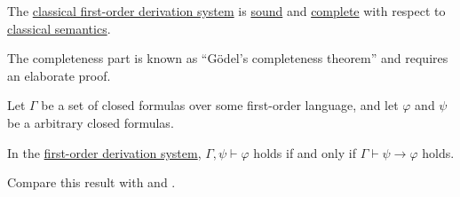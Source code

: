 \begin{theorem}\label{thm:classical_first_order_logic_is_sound_and_complete}
  The \hyperref[def:first_order_derivation_system]{classical first-order derivation system} is \hyperref[def:derivability_and_satisfiability/soundness]{sound} and \hyperref[def:derivability_and_satisfiability/completeness]{complete} with respect to \hyperref[def:first_order_semantics]{classical semantics}.

  The completeness part is known as \enquote{G\"odel's completeness theorem} and requires an elaborate proof.
\end{theorem}

\begin{theorem}\label{thm:first_order_syntactic_deduction_theorem}
  Let \( \Gamma \) be a set of closed formulas over some first-order language, and let \( \varphi \) and \( \psi \) be a arbitrary closed formulas.

  In the \hyperref[def:minimal_propositional_derivation_system]{first-order derivation system}, \( \Gamma, \psi \vdash \varphi \) holds if and only if \( \Gamma \vdash \psi \rightarrow \varphi \) holds.

  Compare this result with  and .
\end{theorem}
